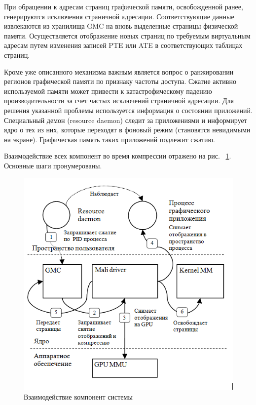 \documentclass[10pt, a5paper]{article}
\begin{document}
При обращении к адресам страниц графической памяти, освобожденной ранее, генерируются исключения страничной адресации.  Соответствующие данные извлекаются из хранилища GMC на вновь выделенные страницы физической памяти. Осуществляется отображение новых страниц по требуемым виртуальным адресам путем изменения записей PTE или ATE в соответствующих таблицах страниц.

Кроме уже описанного механизма важным является вопрос о ранжировании регионов графической памяти по признаку частоты доступа. Сжатие активно используемой памяти может привести к катастрофическому падению производительности за счет частых исключений страничной адресации. Для решения указанной проблемы используется информация о состоянии приложений. Специальный демон (resource daemon) следит за приложениями и информирует ядро о тех из них, которые переходят в фоновый режим (становятся невидимыми на экране). Графическая память таких приложений подлежит сжатию.

Взаимодействие всех компонент во время компрессии отражено на рис. ~\ref{Rogachev2}. Основные шаги пронумерованы.

\begin{figure}
  \centering
  \includegraphics[]{18_2016_Rogachev2.png}
  \caption{Взаимодействие компонент системы}
  \label{Rogachev2}
  
\end{figure}
\end{document}
